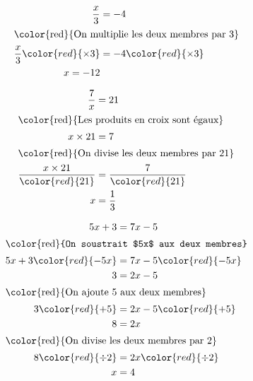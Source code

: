 \begin{exemple*1}
    \begin{minipage}{0.5\linewidth}    
        \begin{center}
            \begin{align*}
                \dfrac{x}{3}&=-4\\\intertext{\color{red}{On multiplie les deux membres par 3}}
                \dfrac{x}{3}\color{red}{\times 3}&=-4\color{red}{\times 3}\\
                x=-12\\
            \end{align*}
        \end{center}
    \end{minipage}
    \begin{minipage}{0.5\linewidth}    
        \begin{center}
            \begin{align*}
                \dfrac{7}{x}&=21\\\intertext{\color{red}{Les produits en croix sont égaux}}
                x\times 21&=7\\\intertext{\color{red}{On divise les deux membres par 21}}
                \frac{x \times 21}{\color{red}{21}}&=\frac{7}{\color{red}{21}}\\
                x&=\frac13\\
            \end{align*}
        \end{center}
    \end{minipage}

    \vspace*{-15mm}
    \begin{minipage}{\linewidth}    
        \begin{center}
            \begin{align*}
                5x+3&=7x-5\\\intertext{\color{red}{On soustrait $5x$ aux deux membres}}
                5x+3\color{red}{-5x}&=7x-5\color{red}{-5x}\\
                3&=2x-5\\\intertext{\color{red}{On ajoute 5 aux deux membres}}
                3\color{red}{+5}&=2x-5\color{red}{+5}\\
                8&=2x\\\intertext{\color{red}{On divise les deux membres par 2}}
                8\color{red}{\div 2}&=2x\color{red}{\div 2}\\
                x&=4\\
            \end{align*}
        \end{center}
    \end{minipage}
\end{exemple*1}